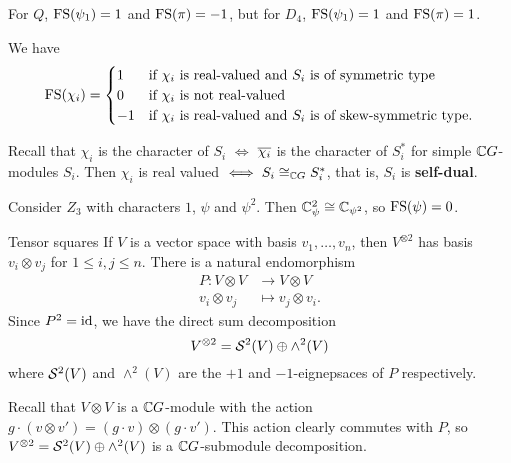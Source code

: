 \begin{exam}
  For $Q$, $\operatorname{FS}(\psi_1)=1$ and $\operatorname{FS}(\pi)=-1$, but for $D_4$, $\operatorname{FS}(\psi_1)=1$ and $\operatorname{FS}(\pi)=1$.
\end{exam}

\begin{thm}
  We have
  \begin{equation*}
    \operatorname{FS}(\chi_i)=
    \begin{cases}
      1 &\text{if $\chi_i$ is real-valued and $S_i$ is of symmetric type} \\
      0 &\text{if $\chi_i$ is not real-valued} \\
      -1 &\text{if $\chi_i$ is real-valued and $S_i$ is of skew-symmetric type.}
    \end{cases}
  \end{equation*}
\end{thm}

\begin{rmk}
  Recall that $\chi_i$ is the character of $S_i$ $\iff$ $\overline{\chi_i}$ is the character of $S_i^*$ for simple $\mathbb{C} G$-modules $S_i$.
  Then $\chi_i$ is real valued $\iff S_i \cong_{\mathbb{C} G} S_i^*$, that is, $S_i$ is \textbf{self-dual}.
\end{rmk}

\begin{exam}
  Consider $Z_3$ with characters $1$, $\psi$ and $\psi^2$.
  Then $\mathbb{C}_\psi^2 \cong \mathbb{C}_{\psi^2}$, so $\operatorname{FS}(\psi)=0$.
\end{exam}

Tensor squares
If $V$ is a vector space with basis $v_1,\ldots,v_n$, then $V^{\otimes 2}$ has basis $v_i \otimes v_j$ for $1 \leq i,j \leq n$.
There is a natural endomorphism
\begin{align*}
  P: V \otimes V &\to V \otimes V \\
  v_i \otimes v_j &\mapsto v_j \otimes v_i.
\end{align*}
Since $P^2=\operatorname{id}$, we have the direct sum decomposition
\[ V^{\otimes 2} = \mathcal{S}^2 (V) \oplus \wedge^2 (V) \]
where $\mathcal{S}^2(V)$ and $\wedge^2(V)$ are the $+1$ and $-1$-eignepsaces of $P$ respectively.

Recall that $V \otimes V$ is a $\mathbb{C} G$-module with the action $g \cdot (v \otimes v') = (g \cdot v) \otimes (g \cdot v')$.
This action clearly commutes with $P$, so $V^{\otimes 2} = \mathcal{S}^2(V) \oplus \wedge^2(V)$ is a $\mathbb{C} G$-submodule decomposition.

